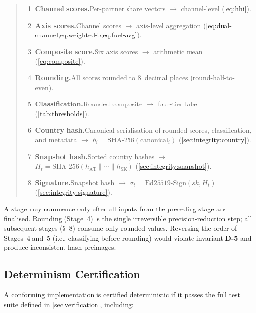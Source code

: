 \begin{quote}\small
\begin{enumerate}[label=\textbf{Stage~\arabic*}., leftmargin=4em]
  \item \textbf{Channel scores.}\enspace  Per-partner share vectors
    \(\to\) channel-level \HHI (\cref{eq:hhi}).
  \item \textbf{Axis scores.}\enspace  Channel scores \(\to\)
    axis-level aggregation (\cref{eq:dual-channel,eq:weighted-b,eq:fuel-avg}).
  \item \textbf{Composite score.}\enspace  Six axis scores \(\to\)
    arithmetic mean (\cref{eq:composite}).
  \item \textbf{Rounding.}\enspace  All scores rounded to 8~decimal
    places (round-half-to-even).
  \item \textbf{Classification.}\enspace  Rounded composite \(\to\)
    four-tier label (\cref{tab:thresholds}).
  \item \textbf{Country hash.}\enspace  Canonical serialisation of
    rounded scores, classification, and metadata \(\to\)
    \(h_i = \mathrm{SHA\text{-}256}(\text{canonical}_i)\)
    (\cref{sec:integrity:country}).
  \item \textbf{Snapshot hash.}\enspace  Sorted country hashes
    \(\to\) \(H_t = \mathrm{SHA\text{-}256}(h_{\mathrm{AT}} \| \cdots \|
    h_{\mathrm{SK}})\) (\cref{sec:integrity:snapshot}).
  \item \textbf{Signature.}\enspace  Snapshot hash \(\to\)
    \(\sigma_t = \mathrm{Ed25519\text{-}Sign}(sk, H_t)\)
    (\cref{sec:integrity:signature}).
\end{enumerate}
\end{quote}

A stage may commence only after all inputs from the preceding stage are
finalised.  Rounding (Stage~4) is the single irreversible precision-reduction
step; all subsequent stages (5--8) consume only rounded values.  Reversing
the order of Stages~4 and~5 (i.e., classifying before rounding) would violate
invariant \textbf{D-5} and produce inconsistent hash preimages.

\subsection{Determinism Certification}\label{sec:det:certification}

A conforming implementation is certified deterministic if it passes the
full test suite defined in \cref{sec:verification}, including:

